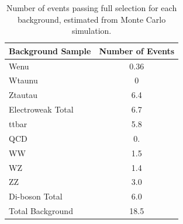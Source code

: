 \begin{table}[htbp]
  \begin{center}
    \caption{Number of events passing full selection 
      for each background, estimated from 
      Monte Carlo simulation.}
    \label{TableBackgroundMC}
    \begin{tabular}[]{ | l | c | }
      \hline
      Background Sample & Number of Events  \\ \hline \hline
      Wenu & 0.36 \\ \hline %
      Wtaunu & 0 \\ \hline %
      Ztautau & 6.4 \\ \hline %
      Electroweak Total & 6.7 \\ \hline \hline %
      ttbar & 5.8 \\ \hline \hline %
      QCD & 0. \\ \hline \hline %
      WW & 1.5 \\ \hline %
      WZ & 1.4 \\ \hline %
      ZZ & 3.0 \\ \hline %
      Di-boson Total & 6.0 \\ \hline \hline %
      Total Background & 18.5 \\ \hline %
    \end{tabular}
  \end{center}
\end{table}



